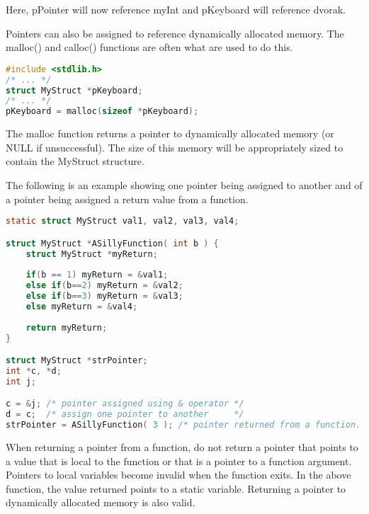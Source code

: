 Here, pPointer will now reference myInt and pKeyboard will reference dvorak.

Pointers can also be assigned to reference dynamically allocated memory. The
malloc() and calloc() functions are often what are used to do this.
\lstset{basicstyle=\scriptsize, numbers=left, captionpos=b, tabsize=4}
\begin{lstlisting}[caption=Section \thesection listing \arabic{pntcnt},language={C},
breaklines=true,xleftmargin=15pt,label=lst:section\thesection listing\arabic{pntcnt}]
#include <stdlib.h>
/* ... */
struct MyStruct *pKeyboard;
/* ... */
pKeyboard = malloc(sizeof *pKeyboard);
\end{lstlisting}

The malloc function returns a pointer to dynamically allocated memory (or NULL
if unsuccessful). The size of this memory will be appropriately sized to
contain the MyStruct structure.

The following is an example showing one pointer being assigned to another and
of a pointer being assigned a return value from a function.
\lstset{basicstyle=\scriptsize, numbers=left, captionpos=b, tabsize=4}
\begin{lstlisting}[caption=Section \thesection listing \arabic{pntcnt},language={C},
breaklines=true,xleftmargin=15pt,label=lst:section\thesection listing\arabic{pntcnt}]
static struct MyStruct val1, val2, val3, val4;

struct MyStruct *ASillyFunction( int b ) {
	struct MyStruct *myReturn;
	
	if(b == 1) myReturn = &val1;
	else if(b==2) myReturn = &val2;
	else if(b==3) myReturn = &val3;
	else myReturn = &val4;
	
	return myReturn;
}

struct MyStruct *strPointer;
int *c, *d;
int j;

c = &j; /* pointer assigned using & operator */
d = c;  /* assign one pointer to another     */
strPointer = ASillyFunction( 3 ); /* pointer returned from a function. */
\end{lstlisting}

When returning a pointer from a function, do not return a pointer that points
to a value that is local to the function or that is a pointer to a function
argument. Pointers to local variables become invalid when the function exits.
In the above function, the value returned points to a static variable.
Returning a pointer to dynamically allocated memory is also valid.

